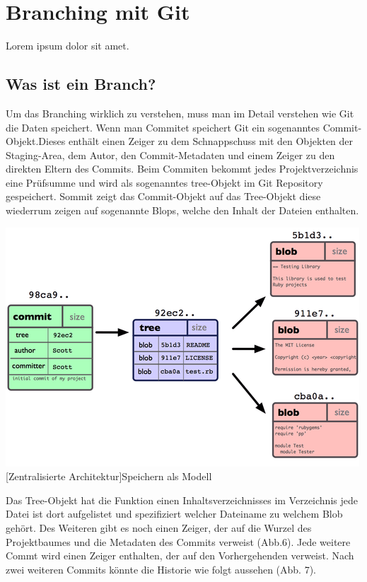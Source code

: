 \documentclass[12pt,a4paper,bibliography=totocnumbered,listof=totocnumbered]{scrartcl}
\begin{document}
\section{Branching mit Git}
Lorem ipsum dolor sit amet.

\subsection{Was ist ein Branch?}
Um das Branching wirklich zu verstehen, muss man im Detail verstehen wie Git die Daten speichert.	Wenn man Commitet speichert Git	ein sogenanntes Commit-Objekt.Dieses enthält einen Zeiger zu dem Schnappschuss mit den Objekten der Staging-Area, dem Autor, den Commit-Metadaten und einem Zeiger zu den direkten Eltern des Commits. Beim Commiten bekommt jedes Projektverzeichnis eine Prüfsumme und wird  als sogenanntes tree-Objekt im Git Repository gespeichert. Sommit zeigt das Commit-Objekt auf das Tree-Objekt	diese wiederrum zeigen auf sogenannte Blops, welche den Inhalt der Dateien enthalten.	
\vspace{1em}
\begin{minipage}{\linewidth}
	\centering
	\includegraphics[width=0.6\linewidth]{Bilder/speichern.png}
	[Zentralisierte Architektur]{Speichern als Modell\footnotemark }
	\label{fig:gitspeichern}
\end{minipage} 	

Das Tree-Objekt hat die Funktion einen Inhaltsverzeichnisses im Verzeichnis jede Datei ist dort aufgelistet und  spezifiziert welcher Dateiname zu welchem Blob gehört. Des Weiteren gibt es noch einen  Zeiger, der auf die Wurzel des Projektbaumes und die Metadaten des Commits verweist (Abb.6).	 
Jede weitere Commt wird einen Zeiger enthalten, der auf den Vorhergehenden verweist. Nach zwei weiteren Commits könnte die Historie wie folgt aussehen (Abb. 7).
\end{document}
